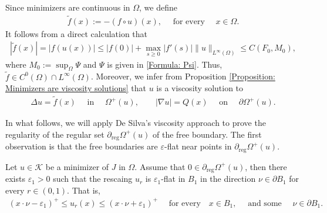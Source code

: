 \documentclass[11pt,reqno]{amsart}
\begin{document}
\begin{remark}\label{Remark: Minimizers are viscisity solutions}
	Since minimizers are continuous in $\Omega$, we define 
	\begin{align}\label{Formula: R(0)}
		\tilde{f}(x):=-(f\circ u)(x),\quad\text{ for every }\quad x\in\Omega.
	\end{align}
	It follows from a direct calculation that
	\begin{align*}
		|\tilde{f}(x)|=|f(u(x))|\leqslant|f(0)|+\max_{s\geqslant0}|f'(s)|\|u\|_{L^{\infty}(\Omega)}\leqslant C(F_{0},M_{0}),
	\end{align*}
	where $M_{0}:=\sup_{\Omega}\Psi$ and $\Psi$ is given in \eqref{Formula: Psi}. Thus, $\tilde{f}\in C^{0}(\Omega)\cap L^{\infty}(\Omega)$. Moreover, we infer from Proposition \ref{Proposition: Minimizers are viscosity solutions} that $u$ is a viscosity solution to
	\begin{align}\label{Formula: R(1)}
		\Delta u=\tilde{f}(x)\quad\text{ in }\quad\varOmega^{+}(u),\qquad|\nabla u|=Q(x)\quad\text{ on }\quad\partial\varOmega^{+}(u).
	\end{align}
\end{remark}
In what follows, we will apply De Silva's viscosity approach to prove the regularity of the regular set $\partial_{\mathrm{reg}}\varOmega^{+}(u)$ of the free boundary. The first observation is that the free boundaries are $\varepsilon$-flat near points in $\partial_{\mathrm{reg}}\varOmega^{+}(u)$.
\begin{lemma}\label{Lemma: epsilon-flat for regular free boundary points}
	Let $u\in\mathcal{K}$ be a minimizer of $J$ in $\Omega$. Assume that $0\in\partial_{\mathrm{reg}}\varOmega^{+}(u)$, then there exists $\varepsilon_{1}>0$ such that the rescaing $u_{r}$ is $\varepsilon_{1}$-flat in $B_{1}$ in the direction $\nu\in\partial B_{1}$ for every $r\in(0,1)$. That is,
	\begin{align*}
		(x\cdot\nu-\varepsilon_{1})^{+}\leqslant u_{r}(x)\leqslant(x\cdot\nu+\varepsilon_{1})^{+}\quad\text{ for every}\quad x\in B_{1},\quad\text{ and some }\quad\nu\in\partial B_{1}.
	\end{align*}
\end{lemma}
\end{document}
